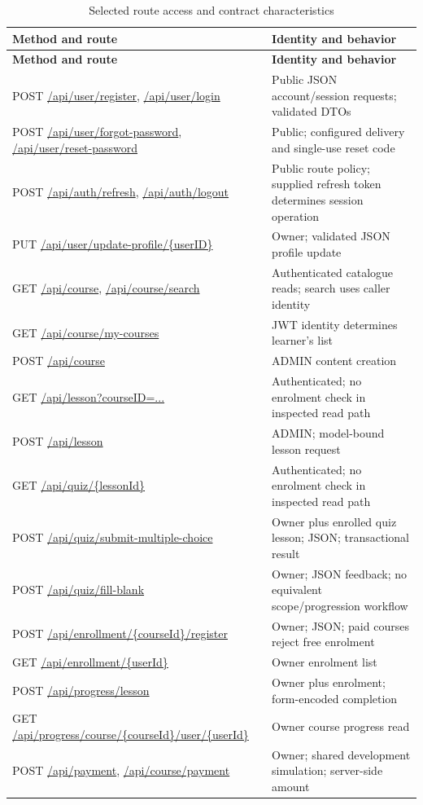 \documentclass[12pt,a4paper,oneside]{report}
\begin{document}
\begin{longtable}{P{0.44\textwidth}P{0.45\textwidth}}
\caption{Selected route access and contract characteristics}\label{tab:route-access}\\\toprule
\textbf{Method and route} & \textbf{Identity and behavior}\\\midrule\endfirsthead
\toprule\textbf{Method and route} & \textbf{Identity and behavior}\\\midrule\endhead
POST \url{/api/user/register}, \url{/api/user/login} & Public JSON account/session requests; validated DTOs\\
POST \url{/api/user/forgot-password}, \url{/api/user/reset-password} & Public; configured delivery and single-use reset code\\
POST \url{/api/auth/refresh}, \url{/api/auth/logout} & Public route policy; supplied refresh token determines session operation\\
PUT \url{/api/user/update-profile/{userID}} & Owner; validated JSON profile update\\
GET \url{/api/course}, \url{/api/course/search} & Authenticated catalogue reads; search uses caller identity\\
GET \url{/api/course/my-courses} & JWT identity determines learner's list\\
POST \url{/api/course} & ADMIN content creation\\
GET \url{/api/lesson?courseID=...} & Authenticated; no enrolment check in inspected read path\\
POST \url{/api/lesson} & ADMIN; model-bound lesson request\\
GET \url{/api/quiz/{lessonId}} & Authenticated; no enrolment check in inspected read path\\
POST \url{/api/quiz/submit-multiple-choice} & Owner plus enrolled quiz lesson; JSON; transactional result\\
POST \url{/api/quiz/fill-blank} & Owner; JSON feedback; no equivalent scope/progression workflow\\
POST \url{/api/enrollment/{courseId}/register} & Owner; JSON; paid courses reject free enrolment\\
GET \url{/api/enrollment/{userId}} & Owner enrolment list\\
POST \url{/api/progress/lesson} & Owner plus enrolment; form-encoded completion\\
GET \url{/api/progress/course/{courseId}/user/{userId}} & Owner course progress read\\
POST \url{/api/payment}, \url{/api/course/payment} & Owner; shared development simulation; server-side amount\\

\end{longtable}
\end{document}
